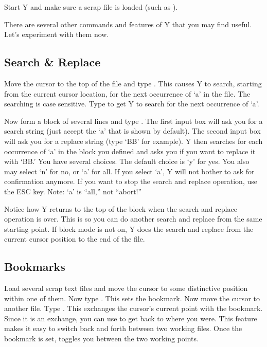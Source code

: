 Start Y and make sure a scrap file is loaded (such as ).

There are several other commands and features of Y that you may find useful. Let's experiment
with them now.

\subsection{Search \& Replace}

Move the cursor to the top of the file and type . This causes Y to search,
starting from the current cursor location, for the next occurrence of `a' in the file. The
searching is case sensitive. Type  to get Y to search for the next occurrence of
`a'.

Now form a block of several lines and type . The first input box will ask you for
a search string (just accept the `a' that is shown by default). The second input box will ask
you for a replace string (type `BB' for example). Y then searches for each occurrence of `a' in
the block you defined and asks you if you want to replace it with `BB.' You have several
choices. The default choice is `y' for yes. You also may select `n' for no, or `a' for all. If
you select `a', Y will not bother to ask for confirmation anymore. If you want to stop the
search and replace operation, use the ESC key. Note: `a' is ``all,'' not ``abort!''

Notice how Y returns to the top of the block when the search and replace operation is over. This
is so you can do another search and replace from the same starting point. If block mode is not
on, Y does the search and replace from the current cursor position to the end of the file.

\subsection{Bookmarks}

Load several scrap text files and move the cursor to some distinctive position within one of
them. Now type . This sets the bookmark. Now move the cursor to another file.
Type . This exchanges the cursor's current point with the bookmark. Since it is
an exchange, you can use  to get back to where you were. This feature makes it
easy to switch back and forth between two working files. Once the bookmark is set,
 toggles you between the two working points.

